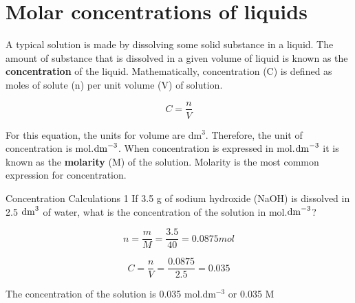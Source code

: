 



\section{Molar concentrations of liquids}
\label{sec:quant:liquids}


A typical solution is made by dissolving some solid substance in a liquid. The amount of substance that is dissolved in a given volume of liquid is known as the \textbf{concentration} of the liquid. Mathematically, concentration (C) is defined as moles of solute (n) per unit volume (V) of solution. 

\begin{equation*}
C = \frac{n}{V} 
\end{equation*}

For this equation, the units for volume are dm$^{3}$. Therefore, the unit of concentration is mol.$\rm{dm}^{-3}$. 
When concentration is expressed in mol.$\rm{dm}^{-3}$ it is known as the \textbf{molarity} (M) of the solution. Molarity is the most common expression for concentration.



\begin{wex}{Concentration Calculations 1}{
If 3.5 g of sodium hydroxide (NaOH) is dissolved in 2.5 $\rm{dm}^{3}$ of water, what is the concentration of the solution in mol.$\rm{dm}^{-3}$?\\}

{

\begin{equation*}
n = \frac{m}{M} = \frac{3.5}{40} = 0.0875 mol 
\end{equation*}


\begin{equation*}
C = \frac{n}{V} = \frac{0.0875}{2.5} = 0.035
\end{equation*}

The concentration of the solution is 0.035 mol.dm$^{-3}$ or 0.035 M 
}
\end{wex}

